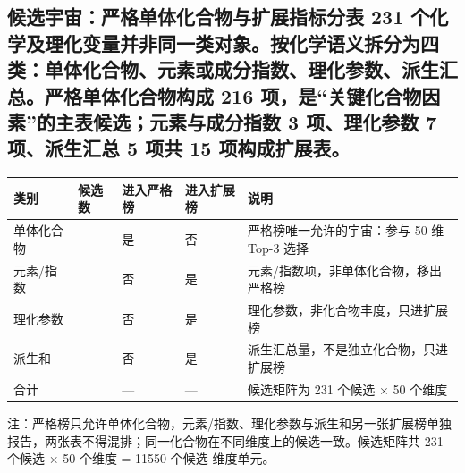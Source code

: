\documentclass[11pt,a4paper]{article}
\newenvironment{bptable}{%
  \par\medskip\noindent\begin{minipage}{\linewidth}\centering
}{%
  \end{minipage}\par\medskip
}
\newenvironment{tablenote}{%
  \par\smallskip\noindent\footnotesize
  \setlength{\parindent}{0pt}\setlength{\parskip}{0pt}%
  \raggedright
}{%
  \par\medskip
}
\begin{document}
\subsection{候选宇宙：严格单体化合物与扩展指标分表 231
个化学及理化变量并非同一类对象。按化学语义拆分为四类：单体化合物、元素或成分指数、理化参数、派生汇总。严格单体化合物构成
216 项，是``关键化合物因素''的主表候选；元素与成分指数 3 项、理化参数 7
项、派生汇总 5 项共 15
项构成扩展表。}\label{ux5019ux9009ux5b87ux5b99ux4e25ux683cux5355ux4f53ux5316ux5408ux7269ux4e0eux6269ux5c55ux6307ux6807ux5206ux8868-231-ux4e2aux5316ux5b66ux53caux7406ux5316ux53d8ux91cfux5e76ux975eux540cux4e00ux7c7bux5bf9ux8c61ux6309ux5316ux5b66ux8bedux4e49ux62c6ux5206ux4e3aux56dbux7c7bux5355ux4f53ux5316ux5408ux7269ux5143ux7d20ux6216ux6210ux5206ux6307ux6570ux7406ux5316ux53c2ux6570ux6d3eux751fux6c47ux603bux4e25ux683cux5355ux4f53ux5316ux5408ux7269ux6784ux6210-216-ux9879ux662fux5173ux952eux5316ux5408ux7269ux56e0ux7d20ux7684ux4e3bux8868ux5019ux9009ux5143ux7d20ux4e0eux6210ux5206ux6307ux6570-3-ux9879ux7406ux5316ux53c2ux6570-7-ux9879ux6d3eux751fux6c47ux603b-5-ux9879ux5171-15-ux9879ux6784ux6210ux6269ux5c55ux8868}

\begin{bptable}
\setcounter{table}{5}
\label{tab:q2-universe}
\par\smallskip
\small
\begin{tabular}{@{}>{\raggedright\arraybackslash}p{}>{\raggedleft\arraybackslash}p{}>{\raggedright\arraybackslash}p{}>{\raggedright\arraybackslash}p{}>{\raggedright\arraybackslash}p{}@{}}
\toprule
类别 & 候选数 & 进入严格榜 & 进入扩展榜 & 说明 \\
\midrule
单体化合物 & 216 & 是 & 否 & 严格榜唯一允许的宇宙：参与 50 维 Top-3 选择 \\
元素/\allowbreak{}指数 & 3 & 否 & 是 & 元素/\allowbreak{}指数项，非单体化合物，移出严格榜 \\
理化参数 & 7 & 否 & 是 & 理化参数，非化合物丰度，只进扩展榜 \\
派生和 & 5 & 否 & 是 & 派生汇总量，不是独立化合物，只进扩展榜 \\
合计 & 231 & — & — & 候选矩阵为 231 个候选 × 50 个维度 \\
\bottomrule
\end{tabular}
\begin{tablenote}注：严格榜只允许单体化合物，元素/指数、理化参数与派生和另一张扩展榜单独报告，两张表不得混排；同一化合物在不同维度上的候选一致。候选矩阵共 231 个候选 × 50 个维度 = 11550 个候选-维度单元。\end{tablenote}
\end{bptable}
\end{document}

